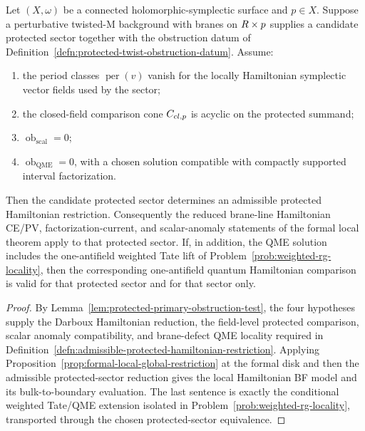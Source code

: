 \begin{thm}\label{thm:protected-twist-hamiltonian-criterion}
  Let \((X,\omega)\) be a connected holomorphic-symplectic surface and
  \(p\in X\).  Suppose a perturbative twisted-M background with branes on
  \(R\times p\) supplies a candidate protected sector together with the
  obstruction datum of
  Definition~\ref{defn:protected-twist-obstruction-datum}.  Assume:
  \begin{enumerate}[label=(\roman*)]
    \item the period classes \(\operatorname{per}(v)\) vanish for the
      locally Hamiltonian symplectic vector fields used by the sector;
    \item the closed-field comparison cone \(C_{cl,p}\) is
      acyclic on the protected summand;
    \item \(\operatorname{ob}_{\mathrm{scal}}=0\);
    \item \(\operatorname{ob}_{\mathrm{QME}}=0\), with a chosen solution
      compatible with compactly supported interval factorization.
  \end{enumerate}
  Then the candidate protected sector determines an admissible protected
  Hamiltonian restriction.  Consequently the reduced brane-line
  Hamiltonian CE/PV, factorization-current, and scalar-anomaly
  statements of the formal local theorem apply to that protected sector.
  If, in addition, the QME solution
  includes the one-antifield weighted Tate lift of
  Problem~\ref{prob:weighted-rg-locality}, then the corresponding
  one-antifield quantum Hamiltonian comparison is valid for that
  protected sector and for that sector only.
\end{thm}

\begin{proof}
  By Lemma~\ref{lem:protected-primary-obstruction-test}, the four
  hypotheses supply the Darboux Hamiltonian reduction, the field-level
  protected comparison, scalar anomaly compatibility, and brane-defect
  QME locality required in
  Definition~\ref{defn:admissible-protected-hamiltonian-restriction}.
  Applying Proposition~\ref{prop:formal-local-global-restriction} at the
  formal disk and then the admissible protected-sector reduction gives the
  local Hamiltonian BF model and its bulk-to-boundary evaluation.  The last
  sentence is exactly the conditional weighted Tate/QME extension isolated in
  Problem~\ref{prob:weighted-rg-locality}, transported through the chosen
  protected-sector equivalence.
\end{proof}

